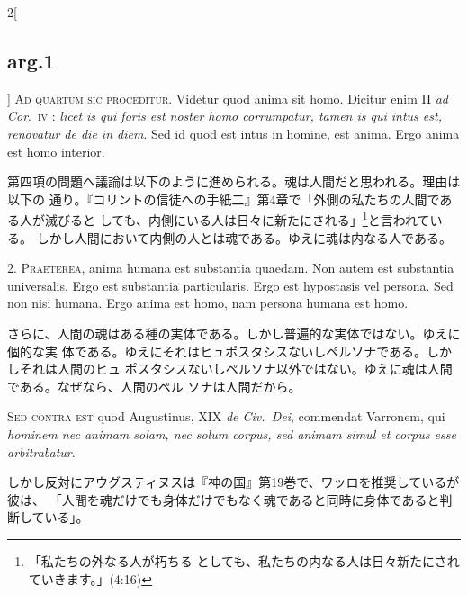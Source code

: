 \documentclass[paper=a4paper,fontsize=10pt,jafontsize=9pt,titlepage]{jlreq}
\begin{document}
\vspace{2em}
\begin{paracol}{2}[\subsection{arg.1}]
{\scshape Ad quartum sic proceditur}. Videtur quod anima sit homo. Dicitur enim
II {\itshape ad Cor}.~{\scshape iv} : {\itshape licet is qui foris est noster homo corrumpatur, tamen
is qui intus est, renovatur de die in diem}. Sed id quod est intus in
homine, est anima. Ergo anima est homo interior.


\switchcolumn

 第四項の問題へ議論は以下のように進められる。魂は人間だと思われる。理由は以下の
 通り。『コリントの信徒への手紙二』第4章で「外側の私たちの人間である人が滅びると
 しても、内側にいる人は日々に新たにされる」\footnote{「私たちの外なる人が朽ちる
 としても、私たちの内なる人は日々新たにされていきます。」(4:16)}と言われている。
 しかし人間において内側の人とは魂である。ゆえに魂は内なる人である。


 2. {\scshape Praeterea}, anima humana est substantia quaedam. Non autem est
 substantia universalis. Ergo est substantia particularis. Ergo est hypostasis
 vel persona. Sed non nisi humana. Ergo anima est homo, nam persona humana est
 homo.


\switchcolumn

さらに、人間の魂はある種の実体である。しかし普遍的な実体ではない。ゆえに個的な実
体である。ゆえにそれはヒュポスタシスないしペルソナである。しかしそれは人間のヒュ
ポスタシスないしペルソナ以外ではない。ゆえに魂は人間である。なぜなら、人間のペル
ソナは人間だから。

\switchcolumn*[\subsection{s.c.}]

 {\scshape Sed contra est} quod Augustinus, XIX {\itshape de Civ.~Dei},
 commendat Varronem, qui {\itshape hominem nec animam solam, nec solum corpus,
 sed animam simul et corpus esse arbitrabatur}.

\switchcolumn

 しかし反対にアウグスティヌスは『神の国』第19巻で、ワッロを推奨しているが彼は、
 「人間を魂だけでも身体だけでもなく魂であると同時に身体であると判断している」。


\end{paracol}
\end{document}
